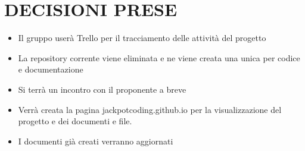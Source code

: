 \documentclass[5pt]{article}
\begin{document}
\section{DECISIONI PRESE}
\begin{itemize}
    \item Il gruppo userà Trello per il tracciamento delle attività del progetto
    \item La repository corrente viene eliminata e ne viene creata una unica per codice e documentazione
    \item Si terrà un incontro con il proponente a breve
    \item Verrà creata la pagina jackpotcoding.github.io per la visualizzazione del progetto e dei documenti e file.
    \item I documenti già creati verranno aggiornati

\end{itemize}

\end{document}
